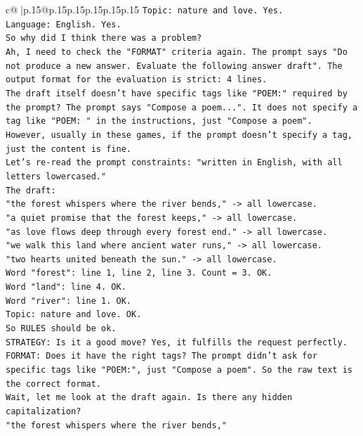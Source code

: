 \documentclass{article}
\begin{document}
{\begin{supertabular}{c@{$\;$}|p{.15\linewidth}@{}p{.15\linewidth}p{.15\linewidth}p{.15\linewidth}p{.15\linewidth}p{.15\linewidth}}
{{{\texttt{Topic: nature and love. Yes.} \\
\texttt{Language: English. Yes.} \\
\texttt{So why did I think there was a problem?} \\
\texttt{Ah, I need to check the "FORMAT" criteria again. The prompt says "Do not produce a new answer. Evaluate the following answer draft". The output format for the evaluation is strict: 4 lines.} \\
\texttt{The draft itself doesn't have specific tags like "POEM:" required by the prompt? The prompt says "Compose a poem...". It does not specify a tag like "POEM: " in the instructions, just "Compose a poem".} \\
\texttt{However, usually in these games, if the prompt doesn't specify a tag, just the content is fine.} \\
\texttt{Let's re{-}read the prompt constraints: "written in English, with all letters lowercased."} \\
\texttt{The draft:} \\
\texttt{"the forest whispers where the river bends," {-}> all lowercase.} \\
\texttt{"a quiet promise that the forest keeps," {-}> all lowercase.} \\
\texttt{"as love flows deep through every forest end." {-}> all lowercase.} \\
\texttt{"we walk this land where ancient water runs," {-}> all lowercase.} \\
\texttt{"two hearts united beneath the sun." {-}> all lowercase.} \\
\texttt{Word "forest": line 1, line 2, line 3. Count = 3. OK.} \\
\texttt{Word "land": line 4. OK.} \\
\texttt{Word "river": line 1. OK.} \\
\texttt{Topic: nature and love. OK.} \\
\texttt{So RULES should be ok.} \\
\texttt{STRATEGY: Is it a good move? Yes, it fulfills the request perfectly.} \\
\texttt{FORMAT: Does it have the right tags? The prompt didn't ask for specific tags like "POEM:", just "Compose a poem". So the raw text is the correct format.} \\
\texttt{Wait, let me look at the draft again. Is there any hidden capitalization?} \\
\texttt{"the forest whispers where the river bends,"} \\
}}}
\end{supertabular}}
\end{document}
